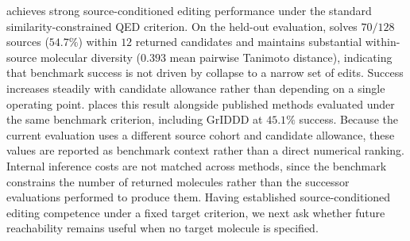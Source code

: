 \method{} achieves strong source-conditioned editing performance under the standard similarity-constrained QED criterion. On the held-out evaluation, \method{} solves $70/128$ sources ($54.7\%$) within $12$ returned candidates and maintains substantial within-source molecular diversity ($0.393$ mean pairwise Tanimoto distance), indicating that benchmark success is not driven by collapse to a narrow set of edits. Success increases steadily with candidate allowance rather than depending on a single operating point.  places this result alongside published methods evaluated under the same benchmark criterion, including GrIDDD at $45.1\%$ success. Because the current \method{} evaluation uses a different source cohort and candidate allowance, these values are reported as benchmark context rather than a direct numerical ranking. Internal inference costs are not matched across methods, since the benchmark constrains the number of returned molecules rather than the successor evaluations performed to produce them. Having established source-conditioned editing competence under a fixed target criterion, we next ask whether future reachability remains useful when no target molecule is specified.


